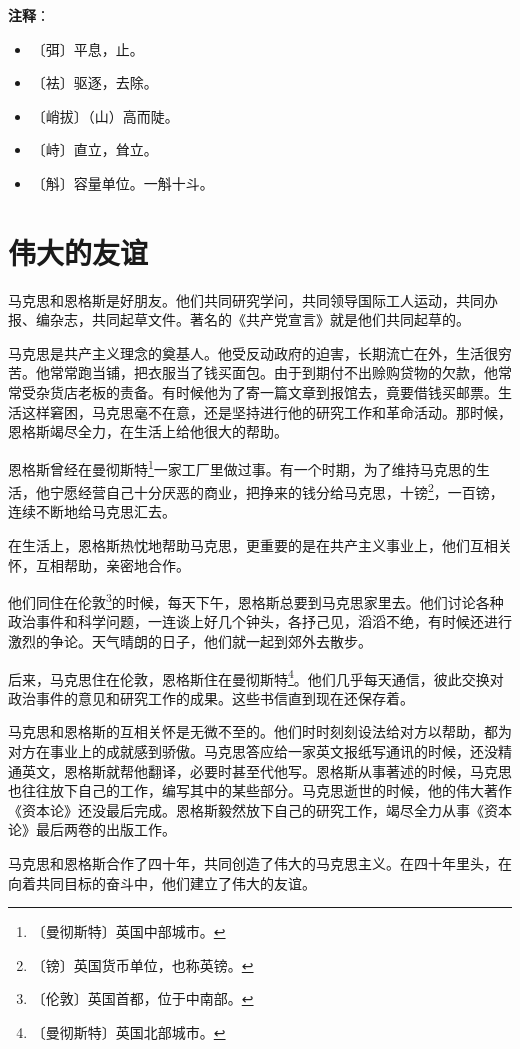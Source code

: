 \documentclass[12pt,UTF-8,openany]{ctexbook}
\begin{document}
\newpage

\textbf{注释}：

\vspace{-1em}

\begin{itemize}
    \setlength\itemsep{-0.2em}
    \item 〔弭〕平息，止。
    \item 〔袪〕驱逐，去除。
    \item 〔峭拔〕（山）高而陡。
    \item 〔峙〕直立，耸立。
    \item 〔斛〕容量单位。一斛十斗。
\end{itemize}

\chapter{伟大的友谊}

\begin{Large}
    
    马克思和恩格斯是好朋友。他们共同研究学问，共同领导国际工人运动，共同办报、编杂志，共同起草文件。著名的《共产党宣言》就是他们共同起草的。
    
    马克思是共产主义理念的奠基人。他受反动政府的迫害，长期流亡在外，生活很穷苦。他常常跑当铺，把衣服当了钱买面包。由于到期付不出赊购贷物的欠款，他常常受杂货店老板的责备。有时候他为了寄一篇文章到报馆去，竟要借钱买邮票。生活这样窘困，马克思毫不在意，还是坚持进行他的研究工作和革命活动。那时候，恩格斯竭尽全力，在生活上给他很大的帮助。
    
    恩格斯曾经在曼彻斯特\footnote{〔曼彻斯特〕英国中部城市。}一家工厂里做过事。有一个时期，为了维持马克思的生活，他宁愿经营自己十分厌恶的商业，把挣来的钱分给马克思，十镑\footnote{〔镑〕英国货币单位，也称英镑。}，一百镑，连续不断地给马克思汇去。
    
    在生活上，恩格斯热忱地帮助马克思，更重要的是在共产主义事业上，他们互相关怀，互相帮助，亲密地合作。
    
    他们同住在伦敦\footnote{〔伦敦〕英国首都，位于中南部。}的时候，每天下午，恩格斯总要到马克思家里去。他们讨论各种政治事件和科学问题，一连谈上好几个钟头，各抒己见，滔滔不绝，有时候还进行激烈的争论。天气晴朗的日子，他们就一起到郊外去散步。
    
    后来，马克思住在伦敦，恩格斯住在曼彻斯特\footnote{〔曼彻斯特〕英国北部城市。}。他们几乎每天通信，彼此交换对政治事件的意见和研究工作的成果。这些书信直到现在还保存着。
    
    马克思和恩格斯的互相关怀是无微不至的。他们时时刻刻设法给对方以帮助，都为对方在事业上的成就感到骄傲。马克思答应给一家英文报纸写通讯的时候，还没精通英文，恩格斯就帮他翻译，必要时甚至代他写。恩格斯从事著述的时候，马克思也往往放下自己的工作，编写其中的某些部分。马克思逝世的时候，他的伟大著作《资本论》还没最后完成。恩格斯毅然放下自己的研究工作，竭尽全力从事《资本论》最后两卷的出版工作。
    
    马克思和恩格斯合作了四十年，共同创造了伟大的马克思主义。在四十年里头，在向着共同目标的奋斗中，他们建立了伟大的友谊。
    
\end{Large}
\end{document}
